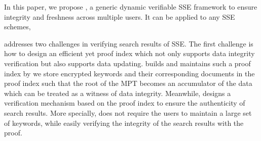 In this paper, we propose \name, a generic dynamic verifiable SSE framework to ensure  integrity and freshness across multiple users. It can be applied to any SSE schemes,  %

\name addresses two challenges in verifying search results of SSE. The first challenge is how to design an efficient yet  proof index which not only supports data integrity verification but also supports data updating. \name builds and maintains such a proof index by  we store encrypted keywords and their corresponding documents in the proof index such that the root of the MPT becomes an accumulator of the data\red{,} which can be treated as a witness of data integrity. Meanwhile, \name designs a verification mechanism based on the proof index to ensure the authenticity of search results.  More specially, \name does not require the users to maintain a large set of keywords, while easily verifying the integrity of the search results with the proof.

